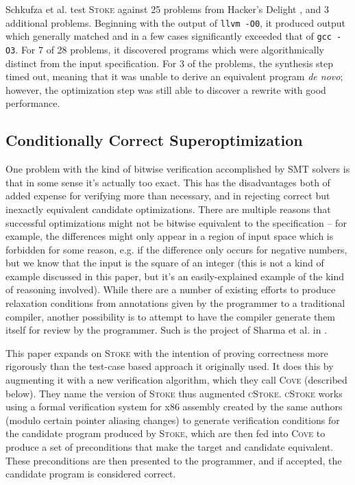 \documentclass[12pt,twoside]{reedthesis}
\begin{document}
        Schkufza et al. test \textsc{Stoke} against 25 problems from Hacker's Delight \cite{warren2013hackers}, and 3 additional problems. 
        Beginning with the output of \texttt{llvm -O0}, it produced output which generally matched and in a few cases significantly exceeded that of \texttt{gcc -O3}.
        For 7 of 28 problems, it discovered programs which were algorithmically distinct from the input specification.
        For 3 of the problems, the synthesis step timed out, meaning that it was unable to derive an equivalent program \textit{de novo}; however, the optimization step was still able to discover a rewrite with good performance.

    \subsection{Conditionally Correct Superoptimization}
        One problem with the kind of bitwise verification accomplished by SMT solvers is that in some sense it's actually too exact.
        This has the disadvantages both of added expense for verifying more than necessary, and in rejecting correct but inexactly equivalent candidate optimizations.
        There are multiple reasons that successful optimizations might not be bitwise equivalent to the specification
            -- for example, the differences might only appear in a region of input space which is forbidden for some reason,
                e.g. if the difference only occurs for negative numbers, but we know that the input is the square of an integer
               (this is not a kind of example discussed in this paper, but it's an easily-explained example of the kind of reasoning involved).
        While there are a number of existing efforts to produce relaxation conditions from annotations given by the programmer to a traditional compiler, another possibility is to attempt to have the compiler generate them itself for review by the programmer.
        Such is the project of Sharma et al. in \cite{sharma2015conditionally}.
        
        This paper expands on \textsc{Stoke} with the intention of proving correctness more rigorously than the test-case based approach it originally used.
        It does this by augmenting it with a new verification algorithm, which they call \textsc{Cove} (described below).
        They name the version of \textsc{Stoke} thus augmented \textsc{cStoke}.
        \textsc{cStoke} works using a formal verification system for x86 assembly created by the same authors \cite{sharma2013ddec} (modulo certain pointer aliasing changes) to generate verification conditions for the candidate program produced by \textsc{Stoke}, which are then fed into \textsc{Cove} to produce a set of preconditions that make the target and candidate equivalent.
        These preconditions are then presented to the programmer, and if accepted, the candidate program is considered correct.
        
\end{document}
